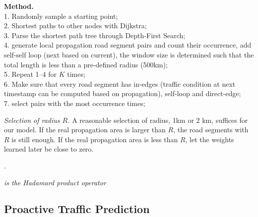 {\bf Method.} \\
1. Randomly sample a starting point; \\
2. Shortest paths to other nodes with Dijkstra; \\
3. Parse the shortest path tree through Depth-First Search; \\
4. generate local propagation road segment pairs and count their occurrence, add self-self loop (next based on current), the window size is determined such that the total length is less than a pre-defined radius (500km); \\
5. Repeat 1--4 for $K$ times; \\
6. Make sure that every road segment has in-edges (traffic condition at next timestamp can be computed based on propagation), self-loop and direct-edge; \\
7. select pairs with the most occurrence times;

{\em Selection of radius $R$.} A reasonable selection of radius, \eg 1km or 2 km, suffices for our model. If the real propagation area is larger than $R$, the road segments with $R$ is still enough. If the real propagation area is less than $R$, let the weights learned later be close to zero.

.


{\em is the Hadamard product operator}

\subsection{Proactive Traffic Prediction}
\label{subsec-proactive}


